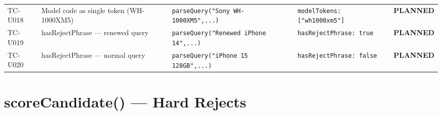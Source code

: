 \documentclass[12pt,a4paper]{report}
\newcommand{\PEND}{\textcolor{pendyellow}{\textbf{PLANNED}}}
\begin{document}
\begin{longtable}{C{1.6cm} L{3.5cm} L{4cm} L{3.5cm} C{1.5cm}}
  TC-U018 &
    Model code as single token (WH-1000XM5) &
    \texttt{parseQuery("Sony WH-1000XM5",...)} &
    \texttt{modelTokens: ["wh1000xm5"]} &
    \PEND \\

  TC-U019 &
    hasRejectPhrase --- renewed query &
    \texttt{parseQuery("Renewed iPhone 14",...)} &
    \texttt{hasRejectPhrase: true} &
    \PEND \\

  TC-U020 &
    hasRejectPhrase --- normal query &
    \texttt{parseQuery("iPhone 15 128GB",...)} &
    \texttt{hasRejectPhrase: false} &
    \PEND \\

\end{longtable}

\section{scoreCandidate() --- Hard Rejects}
\end{document}
